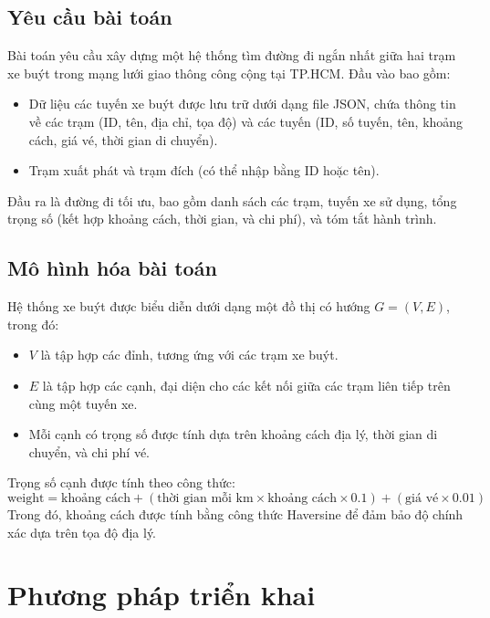 \documentclass[a4paper,12pt]{article}
\begin{document}
\subsection{Yêu cầu bài toán}
Bài toán yêu cầu xây dựng một hệ thống tìm đường đi ngắn nhất giữa hai trạm xe buýt trong mạng lưới giao thông công cộng tại TP.HCM. Đầu vào bao gồm:
\begin{itemize}
    \item Dữ liệu các tuyến xe buýt được lưu trữ dưới dạng file JSON, chứa thông tin về các trạm (ID, tên, địa chỉ, tọa độ) và các tuyến (ID, số tuyến, tên, khoảng cách, giá vé, thời gian di chuyển).
    \item Trạm xuất phát và trạm đích (có thể nhập bằng ID hoặc tên).
\end{itemize}
Đầu ra là đường đi tối ưu, bao gồm danh sách các trạm, tuyến xe sử dụng, tổng trọng số (kết hợp khoảng cách, thời gian, và chi phí), và tóm tắt hành trình.

\subsection{Mô hình hóa bài toán}
Hệ thống xe buýt được biểu diễn dưới dạng một đồ thị có hướng $G = (V, E)$, trong đó:
\begin{itemize}
    \item $V$ là tập hợp các đỉnh, tương ứng với các trạm xe buýt.
    \item $E$ là tập hợp các cạnh, đại diện cho các kết nối giữa các trạm liên tiếp trên cùng một tuyến xe.
    \item Mỗi cạnh có trọng số được tính dựa trên khoảng cách địa lý, thời gian di chuyển, và chi phí vé.
\end{itemize}
Trọng số cạnh được tính theo công thức:
\[
\text{weight} = \text{khoảng cách} + (\text{thời gian mỗi km} \times \text{khoảng cách} \times 0.1) + (\text{giá vé} \times 0.01)
\]
Trong đó, khoảng cách được tính bằng công thức Haversine để đảm bảo độ chính xác dựa trên tọa độ địa lý.

\section{Phương pháp triển khai}
\end{document}
